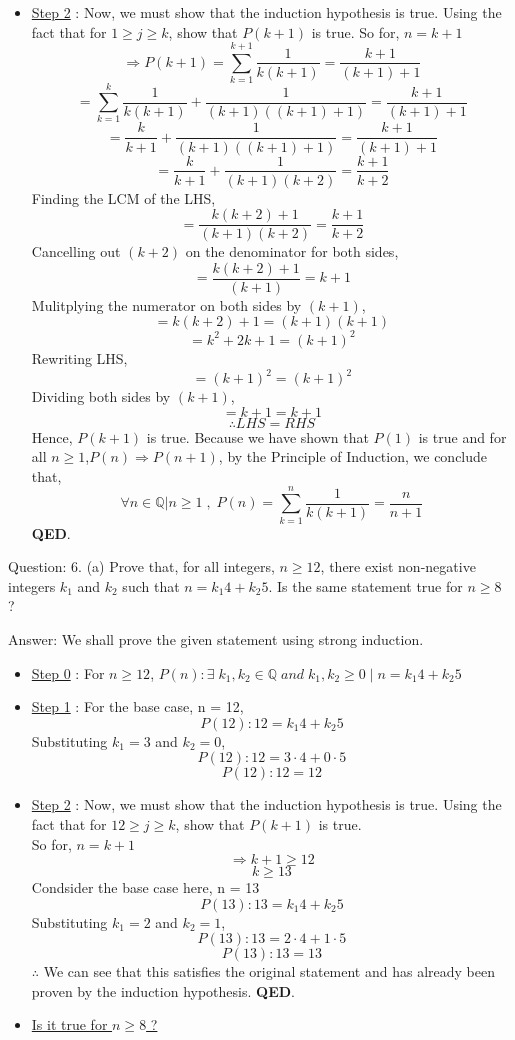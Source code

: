 \documentclass[a4paper]{article}
\begin{document}
\begin{qalist}
\begin{itemize}
				\item \underline{Step 2} : Now, we must show that the induction hypothesis is true. Using the fact that for $1 \geq j \geq k$, show that $P(k+1)$ is true.
					So for, $n = k + 1$ 
					\[\Rightarrow P(k + 1) = \sum_{k=1}^{k+1} \frac{1}{k(k+1)} = \frac{k+1}{(k+1)+1}\]
					\[= \sum_{k=1}^{k} \frac{1}{k(k+1)} +  \frac{1}{(k+1)((k+1)+1)} = \frac{k+1}{(k+1)+1}\]
					\[= \frac{k}{k+1} +  \frac{1}{(k+1)((k+1)+1)} = \frac{k+1}{(k+1)+1}\]
					\[= \frac{k}{k+1} +  \frac{1}{(k+1)(k+2)} = \frac{k+1}{k+2}\]
					Finding the LCM of the LHS,
					\[= \frac{k(k+2) + 1}{(k+1)(k+2)} = \frac{k+1}{k+2}\]
					Cancelling out $(k+2)$ on the denominator for both sides, 
					\[= \frac{k(k+2) + 1}{(k+1)} = k+1\]
					Mulitplying the numerator on both sides by $(k+1)$,
					\[= k(k+2) + 1 = (k+1)(k+1)\]
					\[= {k}^{2} + 2k + 1 = {(k+1)}^{2}\]
					Rewriting LHS, 
					\[={(k+1)}^2 ={(k+1)}^{2}\]
					Dividing both sides by $(k+1)$,
					\[=k+1 = k+1\]
					\[\therefore LHS = RHS\]
				Hence, $P(k + 1)$ is true. Because we have shown that $P(1)$ is true and for all $n \geq 1$,$ P(n) \Rightarrow P(n + 1)$, by the Principle of Induction, we conclude that, 
				\[ \forall n \in \mathbb{Q} | n \geq 1\;, \;P(n) = \sum_{k=1}^{n} \frac{1}{k(k+1)} = \frac{n}{n+1}\]
				\textbf{QED}.
			\end{itemize}

		
		\item[Question: 6. (a)] \setcounter{equation}{0} Prove that, for all integers, $n \geq 12$, there exist non-negative integers ${k}_{1}$ and ${k}_{2}$ such that $n = {k}_{1} 4 + {k}_{2} 5$. Is the same statement true for $n \geq 8$ ?
		\item[Answer:]  We shall prove the given statement using strong induction.
			
			\begin{itemize}
				\item \underline{Step 0} : For $n \geq 12$, $P(n): \exists \; {k}_{1}, {k}_{2} \in \mathbb{Q} \;and\; {k}_{1}, {k}_{2} \geq 0 \; | \; n = {k}_{1} 4 + {k}_{2} 5$ 
				\item \underline{Step 1} : For the base case, n = 12, 
					\[ P(12) : 12 = {k}_{1}4 + {k}_{2}5 \]
					Substituting ${k}_{1} = 3$ and ${k}_{2} = 0$, 
					\[ P(12) : 12 = 3\cdot4 + 0\cdot5 \]
					\[ P(12) : 12 = 12 \]
				\item \underline{Step 2} : Now, we must show that the induction hypothesis is true. Using the fact that for $12 \geq j \geq k$, show that $P(k+1)$ is true.
					\\So for, $n = k + 1$ 
					\[\Rightarrow k + 1 \geq 12\]
					\[k \geq 13\]
					Condsider the base case here, n = 13
					\[P(13) : 13 ={k}_{1}4 + {k}_{2}5 \]
					Substituting ${k}_{1} = 2$ and ${k}_{2} = 1$, 
					\[ P(13) : 13 = 2\cdot4 + 1\cdot5 \]
					\[ P(13) : 13 = 13 \]
					$\therefore$ We can see that this satisfies the original statement and has already been proven by the induction hypothesis. \textbf{QED}.
				\item \underline{Is it true for $n \geq 8$ ?}
				

\end{itemize}
\end{qalist}
\end{document}
